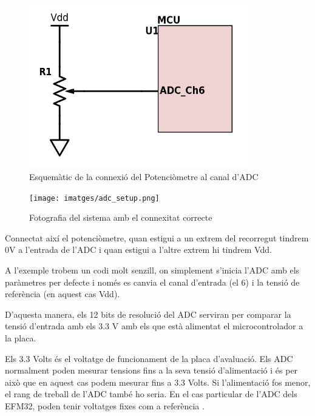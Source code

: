 \begin{figure}
 \centering
 \includegraphics[width=0.85\textwidth, keepaspectratio]{imatges/adc_schematic.png}
 \caption{Esquemàtic de la connexió del Potenciòmetre al canal d'\gls{ADC}}
 \label{fig:sch_adc}
\end{figure}

\begin{figure}
 \centering
 \texttt{[image: imatges/adc\_setup.png]}
 \caption{Fotografia del sistema amb el connexitat correcte}
 \label{fig:setup_adc}
\end{figure}

Connectat així el potenciòmetre, quan estigui a un extrem del recorregut tindrem 0V a l'entrada de l'ADC i quan estigui a l'altre extrem hi tindrem \gls{Vdd}.

A l'exemple trobem un codi molt senzill, on simplement s'inicia l'\gls{ADC} amb els paràmetres per defecte i només es canvia el canal d'entrada (el 6) i la tensió de referència (en aquest cas Vdd).

D'aquesta manera, els 12 bits de resolució del ADC serviran per comparar la tensió d'entrada amb els 3.3 V amb els que està alimentat el microcontrolador a la placa.

\begin{remark}
 Els 3.3 Volts és el voltatge de funcionament de la placa d'avaluació. Els ADC normalment poden mesurar tensions fins a la seva tensió d'alimentació i és per això que en aquest cas podem mesurar fins a 3.3 Volts. Si l'alimentació fos menor, el rang de treball de l'ADC també ho seria. En el cas particular de l'ADC dels EFM32, poden tenir voltatges fixes com a referència \cite[378]{EFM32GRM}.
\end{remark}

